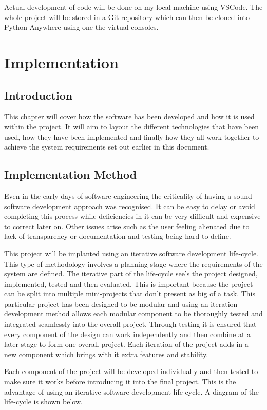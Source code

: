 \documentclass[10pt,a4paper]{article}
\begin{document}
Actual development of code will be done on my local machine using VSCode. The whole project will be stored in a Git repository which can then be cloned into Python Anywhere using one the virtual consoles. 

\pagebreak
\section{Implementation} 
\subsection{Introduction}
This chapter will cover how the software has been developed and how it is used within the project. It will aim to layout the different technologies that have been used, how they have been implemented and finally how they all work together to achieve the system requirements set out earlier in this document.

\subsection{Implementation Method}
Even in the early days of software engineering the criticality of having a sound software development approach was recognised. It can be easy to delay or avoid completing this process while deficiencies in it can be very difficult and expensive to correct later on. Other issues arise such as the user feeling alienated due to lack of transparency or documentation and testing being hard to define\cite{1674590}.

This project will be implanted using an iterative software development life-cycle. This type of methodology involves a planning stage where the requirements of the system are defined. The iterative part of the life-cycle see's the project designed, implemented, tested and then evaluated. This is important because the project can be split into multiple mini-projects that don't present as big of a task. This particular project has been designed to be modular and using an iteration development method allows each modular component to be thoroughly tested and integrated seamlessly into the overall project. Through testing it is ensured that every component of the design can work independently and then combine at a later stage to form one overall project. Each iteration of the project adds in a new component which brings with it extra features and stability. 

Each component of the project will be developed individually and then tested to make sure it works before introducing it into the final project. This is the advantage of using an iterative software development life cycle. A diagram of the life-cycle is shown below. 
\end{document}
